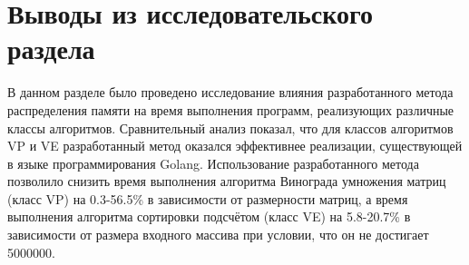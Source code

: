 \section*{Выводы из исследовательского раздела}

В данном разделе было проведено исследование влияния разработанного метода распределения памяти на время выполнения программ, реализующих различные классы алгоритмов. Сравнительный анализ показал, что для классов алгоритмов VP и VE разработанный метод оказался эффективнее реализации, существующей в языке программирования Golang. Использование разработанного метода позволило снизить время выполнения алгоритма Винограда умножения матриц (класс VP) на 0.3-56.5\% в зависимости от размерности матриц, а время выполнения алгоритма сортировки подсчётом (класс VE) на 5.8-20.7\% в зависимости от размера входного массива при условии, что он не достигает 5000000.


